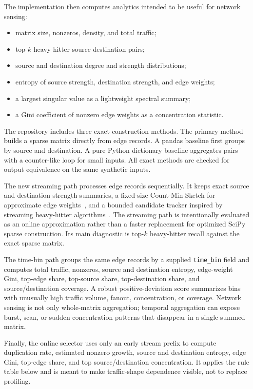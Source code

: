 \documentclass[conference]{IEEEtran}
\begin{document}
The implementation then computes analytics intended to be useful for network sensing:
\begin{itemize}
\item matrix size, nonzeros, density, and total traffic;
\item top-$k$ heavy hitter source-destination pairs;
\item source and destination degree and strength distributions;
\item entropy of source strength, destination strength, and edge weights;
\item a largest singular value as a lightweight spectral summary;
\item a Gini coefficient of nonzero edge weights as a concentration statistic.
\end{itemize}

The repository includes three exact construction methods. The primary method builds a sparse matrix directly from edge records. A pandas baseline first groups by source and destination. A pure Python dictionary baseline aggregates pairs with a counter-like loop for small inputs. All exact methods are checked for output equivalence on the same synthetic inputs.

The new streaming path processes edge records sequentially. It keeps exact source and destination strength summaries, a fixed-size Count-Min Sketch for approximate edge weights~\cite{cormode2005countmin}, and a bounded candidate tracker inspired by streaming heavy-hitter algorithms~\cite{misra1982finding}. The streaming path is intentionally evaluated as an online approximation rather than a faster replacement for optimized SciPy sparse construction. Its main diagnostic is top-$k$ heavy-hitter recall against the exact sparse matrix.

The time-bin path groups the same edge records by a supplied \texttt{time\_bin} field and computes total traffic, nonzeros, source and destination entropy, edge-weight Gini, top-edge share, top-source share, top-destination share, and source/destination coverage. A robust positive-deviation score summarizes bins with unusually high traffic volume, fanout, concentration, or coverage. Network sensing is not only whole-matrix aggregation; temporal aggregation can expose burst, scan, or sudden concentration patterns that disappear in a single summed matrix.

Finally, the online selector uses only an early stream prefix to compute duplication rate, estimated nonzero growth, source and destination entropy, edge Gini, top-edge share, and top source/destination concentration. It applies the rule table below and is meant to make traffic-shape dependence visible, not to replace profiling.
\end{document}
